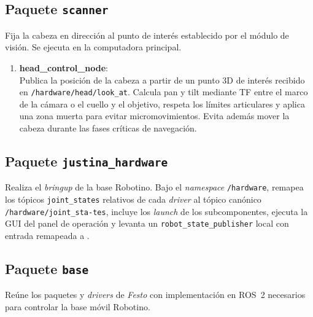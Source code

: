\subsection{Paquete \texttt{scanner}}

Fija la cabeza en dirección al punto de interés establecido por el módulo de visión. Se ejecuta en la computadora principal.

\begin{enumerate}

\item \textbf{head\_control\_node}: \\
Publica la posición de la cabeza a partir de un punto 3D de interés recibido en \texttt{/hardware/head/look\_at}. Calcula pan y tilt mediante TF entre el marco de la cámara o el cuello y el objetivo, respeta los límites articulares y aplica una zona muerta para evitar micromovimientos. Evita además mover la cabeza durante las fases críticas de navegación.

\end{enumerate}

\subsection{Paquete \texttt{justina\_hardware}}

Realiza el \textit{bringup} de la base Robotino. Bajo el \textit{namespace} \texttt{/hardware}, remapea los tópicos \texttt{joint\_states} relativos de cada \textit{driver} al tópico canónico \texttt{/hardware/joint\_sta-\allowbreak{}tes}, incluye los \textit{launch} de los subcomponentes, ejecuta la GUI del panel de operación y levanta un \texttt{robot\_state\_publisher} local con entrada remapeada a .

\subsection{Paquete \texttt{base}}

Reúne los paquetes y \textit{drivers} de \emph{Festo} con implementación en ROS~2 necesarios para controlar la base móvil Robotino.

